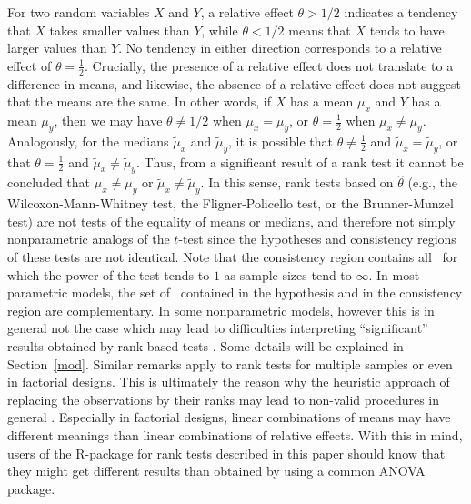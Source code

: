 For two random variables $X$ and $Y$, a relative effect $\theta>1/2$ indicates 
a tendency that $X$ takes smaller values than $Y$, while $\theta <1/2$ means 
that $X$ tends to have larger values than $Y$. No tendency in either direction 
corresponds to a relative effect of $\theta =\tfrac12$. Crucially, the presence of a relative effect does not translate to a difference in means, and likewise, the absence of a relative effect does not suggest that the means are the same. In other words, if $X$ has a mean $\mu_x$  and $Y$ has a mean $\mu_y$, then we may have $\theta \neq 1/2$ when $\mu_x = \mu_y$, or $\theta = \tfrac12$ when $\mu_x \neq \mu_y$.
Analogously, for the medians $\widetilde{\mu}_x$ and $\widetilde{\mu}_y$, it is 
possible that $\theta \neq \frac12$ and $\widetilde{\mu}_x = \widetilde{\mu}_y$,
or that $\theta = \frac12$ and $\widetilde{\mu}_x \neq \widetilde{\mu}_y$. 
Thus, from a significant result of a rank test it cannot be concluded that 
$\mu_x \neq \mu_y$ or $\widetilde{\mu}_x \neq \widetilde{\mu}_y$. In this 
sense, rank tests based on $\widehat{\theta}$ (e.g., the Wilcoxon-Mann-Whitney 
test, the Fligner-Policello test, or the Brunner-Munzel test) are not tests of the equality of means or medians, and therefore not simply nonparametric analogs of the 
$t$-test since the hypotheses and consistency regions of these tests are not 
identical. Note that the consistency region contains all \dfs\ for which the 
power of the test tends to $1$ as sample sizes tend to $\infty$. In most 
parametric models, the set of \dfs\ contained in the hypothesis and in the 
consistency region are complementary. In some nonparametric models, however 
this is in general not the case which may lead to difficulties interpreting 
``significant'' results obtained by rank-based tests \citep{brunner2020ranks}. 
Some details will be explained in Section~\ref{mod}. Similar remarks apply to 
rank tests for multiple samples or even in factorial designs. This is 
ultimately the reason why the heuristic approach of
replacing the observations by their ranks may lead to non-valid procedures in 
general \citep{conover1981rank}. Especially in factorial designs, linear combinations of means may have 
different meanings than linear combinations of relative effects. With this in 
mind, users of the R-package for rank tests described in this paper 
should know that they might get different results than obtained by using a 
common ANOVA package.

